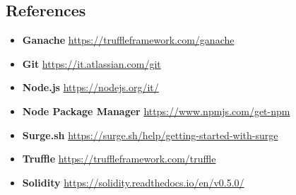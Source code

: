 \subsection{References}
	\begin{itemize}
		\item \textbf{Ganache} \url{https://truffleframework.com/ganache}
		\item \textbf{Git} \url{https://it.atlassian.com/git}
		\item \textbf{Node.js} \url{https://nodejs.org/it/}
		\item \textbf{Node Package Manager} \url{https://www.npmjs.com/get-npm}
		\item \textbf{Surge.sh} \url{https://surge.sh/help/getting-started-with-surge}
		\item \textbf{Truffle} \url{https://truffleframework.com/truffle}
		\item \textbf{Solidity} \url{https://solidity.readthedocs.io/en/v0.5.0/}
	\end{itemize}
